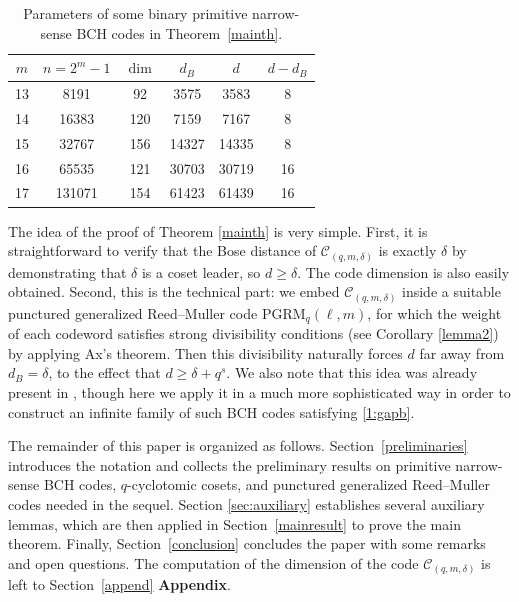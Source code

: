 \documentclass[journal,onecolumn]{IEEEtran}
\newcommand{\PGRM}{\mathrm{PGRM}}
\begin{document}
\begin{table}[htbp]
\centering
\caption{Parameters of some binary primitive narrow-sense BCH codes in
Theorem~\ref{mainth}.}
\label{table1}
\begin{tabular}{cccccc}
\hline
$m$ & $n=2^m-1$ & $\dim$ & $d_B$ & $d$ & $d-d_B$ \\
\hline
13 & 8191   & 92  & 3575  & 3583  & 8  \\
14 & 16383  & 120 & 7159  & 7167  & 8  \\
15 & 32767  & 156 & 14327 & 14335 & 8  \\
16 & 65535  & 121 & 30703 & 30719 & 16 \\
17 & 131071 & 154 & 61423 & 61439 & 16 \\
\hline
\end{tabular}
\end{table}






The idea of the proof of Theorem \ref{mainth} is very simple. First, it is straightforward to verify that the Bose distance of $\mathcal{C}_{(q,m,\delta)}$ is exactly $\delta$ by demonstrating that $\delta$ is a coset leader, so $d \ge \delta$. The code dimension is also easily obtained. Second, this is the technical part: we embed $\mathcal{C}_{(q,m,\delta)}$ inside a suitable punctured generalized Reed--Muller code $\PGRM_q(\ell,m)$, for which the weight of each codeword satisfies strong divisibility conditions (see Corollary \ref{lemma2}) by applying Ax's theorem. Then this divisibility naturally forces $d$ far away from $d_B=\delta$, to the effect that $d \ge \delta+q^s$. We also note that this idea was already present in \cite{KT1969}, though here we apply it in a much more sophisticated way in order to construct an infinite family of such BCH codes satisfying \eqref{1:gapb}.




     



The remainder of this paper is organized as follows.
Section~\ref{preliminaries} introduces the notation and collects the
preliminary results on primitive narrow-sense BCH codes,
$q$-cyclotomic cosets, and punctured generalized Reed--Muller codes
needed in the sequel. Section \ref{sec:auxiliary} establishes several auxiliary lemmas, which
are then applied in Section~\ref{mainresult} to prove the main theorem.
Finally, Section~\ref{conclusion} concludes the paper with some remarks
and open questions. The computation of the dimension of the code $\mathcal{C}_{(q,m,\delta)}$ is left to Section~\ref{append} {\bf Appendix}. 
\end{document}
